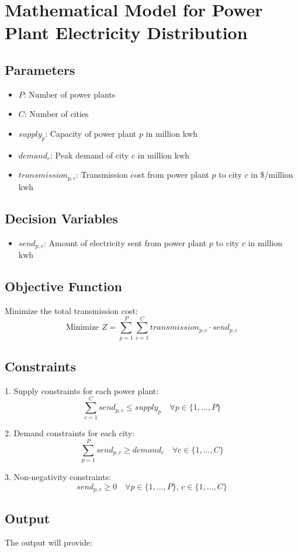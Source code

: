 \documentclass{article}
\begin{document}
\section*{Mathematical Model for Power Plant Electricity Distribution}

\subsection*{Parameters}
\begin{itemize}
    \item $P$: Number of power plants
    \item $C$: Number of cities
    \item $supply_p$: Capacity of power plant $p$ in million kwh
    \item $demand_c$: Peak demand of city $c$ in million kwh
    \item $transmission_{p,c}$: Transmission cost from power plant $p$ to city $c$ in \$/million kwh
\end{itemize}

\subsection*{Decision Variables}
\begin{itemize}
    \item $send_{p,c}$: Amount of electricity sent from power plant $p$ to city $c$ in million kwh
\end{itemize}

\subsection*{Objective Function}
Minimize the total transmission cost:
\[
\text{Minimize } Z = \sum_{p=1}^{P} \sum_{c=1}^{C} transmission_{p,c} \cdot send_{p,c}
\]

\subsection*{Constraints}
1. Supply constraints for each power plant:
\[
\sum_{c=1}^{C} send_{p,c} \leq supply_p \quad \forall p \in \{1, \ldots, P\}
\]

2. Demand constraints for each city:
\[
\sum_{p=1}^{P} send_{p,c} \geq demand_c \quad \forall c \in \{1, \ldots, C\}
\]

3. Non-negativity constraints:
\[
send_{p,c} \geq 0 \quad \forall p \in \{1, \ldots, P\}, \, c \in \{1, \ldots, C\}
\]

\subsection*{Output}
The output will provide:
\end{document}
